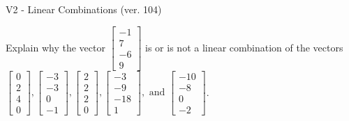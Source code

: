 \begin{exercise}
  \begin{exerciseTitle}V2 - Linear Combinations (ver. 104)\end{exerciseTitle}
  \begin{exerciseStatement}
    Explain why the vector \(\left[\begin{array}{c}
-1 \\
7 \\
-6 \\
9
\end{array}\right]\)  is or is not a linear 
	combination of the vectors \(\left[\begin{array}{c}
0 \\
2 \\
4 \\
0
\end{array}\right] , \left[\begin{array}{c}
-3 \\
-3 \\
0 \\
-1
\end{array}\right] , \left[\begin{array}{c}
2 \\
2 \\
2 \\
0
\end{array}\right] , \left[\begin{array}{c}
-3 \\
-9 \\
-18 \\
1
\end{array}\right] , \text{ and } \left[\begin{array}{c}
-10 \\
-8 \\
0 \\
-2
\end{array}\right]\).
	



\end{exerciseStatement}
\end{exercise}
